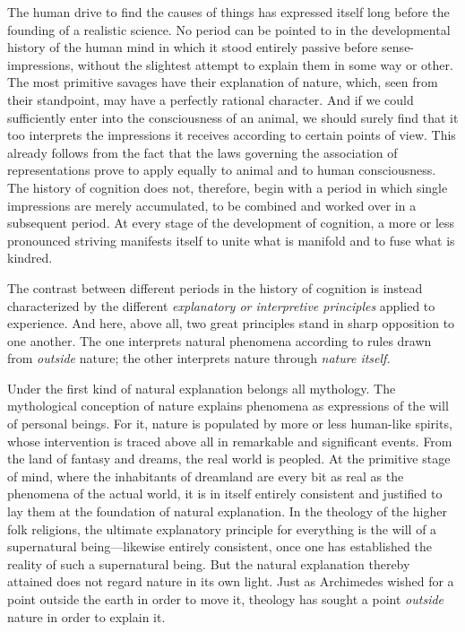 \documentclass[12pt,a4paper]{article}
\newcommand{\opage}[1]{\marginnote{\footnotesize\textit{[#1]}}}
\begin{document}
The human drive to find the causes of things has expressed itself long
before the founding of a realistic science. No period can be pointed to
in the developmental history of the human mind in which it stood entirely
passive before sense-impressions, without the slightest attempt to explain
them in some way or other. The most primitive savages have their
explanation of nature, which, seen from their standpoint, may have a
perfectly rational character. And if we could sufficiently enter into the
consciousness of an animal, we should surely find that it too interprets
the impressions it receives according to certain points of view. This
already follows from the fact that the laws governing the association of
representations prove to apply equally to animal and to human
consciousness. The history of cognition does not, therefore, begin with
a period in which single impressions are merely accumulated, to be
combined and worked over in a subsequent period. At every stage of the
development of cognition, a more or less pronounced striving manifests
itself to unite what is manifold and to fuse what is kindred.

The contrast between different periods in the history of cognition is
instead characterized by the different \emph{explanatory or interpretive principles} applied to experience. And here, above all, two great
principles stand in sharp opposition to one another. The one interprets
natural phenomena according to rules drawn from \emph{outside} nature; the other interprets nature through \emph{nature itself.}

Under the first kind of natural explanation belongs all \opage{3}mythology. The
mythological conception of nature explains phenomena as expressions of
the will of personal beings. For it, nature is populated by more or less
human-like spirits, whose intervention is traced above all in remarkable
and significant events. From the land of fantasy and dreams, the real
world is peopled. At the primitive stage of mind, where the inhabitants
of dreamland are every bit as real as the phenomena of the actual world,
it is in itself entirely consistent and justified to lay them at the
foundation of natural explanation. In the theology of the higher folk
religions, the ultimate explanatory principle for everything is the will
of a supernatural being---likewise entirely consistent, once one has
established the reality of such a supernatural being. But the natural
explanation thereby attained does not regard nature in its own light.
Just as Archimedes wished for a point outside the earth in order to move
it, theology has sought a point \emph{outside} nature in order to explain it.
\end{document}
